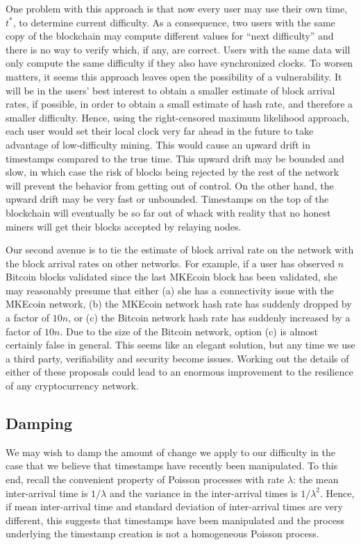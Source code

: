 \documentclass[12pt,english]{mrl}
\theoremstyle{definition}
\numberwithin{equation}{section}
\numberwithin{figure}{section}
\numberwithin{equation}{section}
\numberwithin{equation}{section}
\numberwithin{figure}{section}
\begin{document}
One problem with this approach is that now every user may use their own time, $t^*$, to determine current difficulty. As a consequence, two users with the same copy of the blockchain may compute different values for ``next difficulty'' and there is no way to verify which, if any, are correct. Users with the same data will only compute the same difficulty if they also have synchronized clocks. To worsen matters, it seems this approach leaves open the possibility of a vulnerability. It will be in the users' best interest to obtain a smaller estimate of block arrival rates, if possible, in order to obtain a small estimate of hash rate, and therefore a smaller difficulty. Hence, using the right-censored maximum likelihood approach, each user would set their local clock very far ahead in the future to take advantage of low-difficulty mining. This would cause an upward drift in timestamps compared to the true time. This upward drift may be bounded and slow, in which case the risk of blocks being rejected by the rest of the network will prevent the behavior from getting out of control. On the other hand, the upward drift may be very fast or unbounded. Timestamps on the top of the blockchain will eventually be so far out of whack with reality that no honest miners will get their blocks accepted by relaying nodes.

Our second avenue is to tie the estimate of block arrival rate on the network with the block arrival rates on other networks. For example, if a user has observed $n$ Bitcoin blocks validated since the last MKEcoin block has been validated, she may reasonably presume that either (a) she has a connectivity issue with the MKEcoin network, (b) the MKEcoin network hash rate has suddenly dropped by a factor of $10n$, or (c) the Bitcoin network hash rate has suddenly increased by a factor of $10n$.  Due to the size of the Bitcoin network, option (c) is almost certainly false in general. This seems like an elegant solution, but any time we use a third party, verifiability and security become issues. Working out the details of either of these proposals could lead to an enormous improvement to the resilience of any cryptocurrency network.


\subsection{Damping}

We may wish to damp the amount of change we apply to our difficulty in the case that we believe that timestamps have recently been manipulated. To this end, recall the convenient property of Poisson processes with rate $\lambda$: the mean inter-arrival time is $1/\lambda$ and the variance in the inter-arrival times is $1/\lambda^2$. Hence, if mean inter-arrival time and standard deviation of inter-arrival times are very different, this suggests that timestamps have been manipulated and the process underlying the timestamp creation is not a homogeneous Poisson process. 
\end{document}
